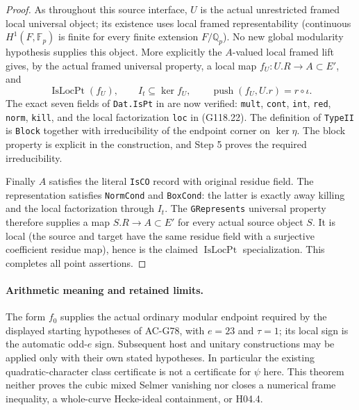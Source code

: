 \begin{proof}
As throughout this source interface, $U$ is the actual unrestricted framed
local universal object; its existence uses local framed representability
(continuous $H^1(F,\mathbb F_p)$ is finite for every finite extension
$F/\mathbb Q_p$).  No new global modularity hypothesis supplies this object.
More explicitly the $A$-valued local framed lift gives, by the actual framed
universal property, a local map $f_U:U.R\to A\subset E'$, and
\[
 \operatorname{IsLocPt}(f_U),\qquad I_t\subseteq\ker f_U,
        \qquad\operatorname{push}(f_U,U.r)=r\circ\iota.
                                                        \tag{G118.22}
\]
The exact seven fields of \texttt{Dat.IsPt} in
 are now verified: \texttt{mult},
\texttt{cont}, \texttt{int}, \texttt{red}, \texttt{norm}, \texttt{kill},
and the local factorization \texttt{loc} in (G118.22).
The definition of \texttt{TypeII} is \texttt{Block} together with irreducibility
of the endpoint corner on $\ker\eta$.  The block property is explicit in the
construction, and Step 5 proves the required irreducibility.

Finally $A$ satisfies the literal \texttt{IsCO} record with original residue
field.  The representation satisfies \texttt{NormCond} and \texttt{BoxCond}:
the latter is exactly away killing and the local factorization through $I_t$.
The \texttt{GRepresents} universal property therefore supplies a map
$S.R\to A\subset E'$ for every actual source object $S$.
It is local (the source and target have the same residue field with a
surjective coefficient residue map), hence is the claimed
$\operatorname{IsLocPt}$ specialization.  This completes all point assertions.
\end{proof}

\paragraph{Arithmetic meaning and retained limits.}
The form $f_0$ supplies the actual ordinary modular endpoint required by the
displayed starting hypotheses of AC-G78, with $e=23$ and $\tau=1$; its local
sign is the automatic odd-$e$ sign.  Subsequent host and unitary constructions
may be applied only with their own stated hypotheses.
In particular the existing quadratic-character class certificate is not a
certificate for $\psi$ here.  This theorem neither proves the cubic mixed
Selmer vanishing nor closes a numerical frame inequality, a whole-curve
Hecke-ideal containment, or H04.4.

